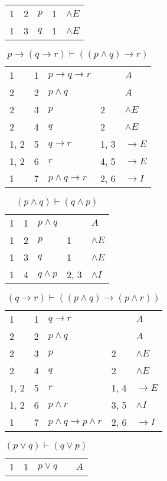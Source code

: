 \documentclass{article}
\begin{document}
\begin{table}[htbp]
\begin{tabular}{lrlll}
{1} & 2 & $p$ & {1} & $∧E$ \\
{1} & 3 & $q$ & {1} & $∧E$ \\
\end{tabular}
\end{table}\begin{table}[htbp]\caption*{$p → (q → r) ⊢ ((p ∧ q) → r)$}\centering\begin{tabular}{lrlll}
{1} & 1 & $p→q→r$ & {} & $A$ \\
{2} & 2 & $p∧q$ & {} & $A$ \\
{2} & 3 & $p$ & {2} & $∧E$ \\
{2} & 4 & $q$ & {2} & $∧E$ \\
{1, 2} & 5 & $q→r$ & {1, 3} & $→E$ \\
{1, 2} & 6 & $r$ & {4, 5} & $→E$ \\
{1} & 7 & $p∧q→r$ & {2, 6} & $→I$ \\
\end{tabular}
\end{table}\begin{table}[htbp]\caption*{$(p ∧ q) ⊢ (q ∧ p)$}\centering\begin{tabular}{lrlll}
{1} & 1 & $p∧q$ & {} & $A$ \\
{1} & 2 & $p$ & {1} & $∧E$ \\
{1} & 3 & $q$ & {1} & $∧E$ \\
{1} & 4 & $q∧p$ & {2, 3} & $∧I$ \\
\end{tabular}
\end{table}\begin{table}[htbp]\caption*{$(q → r) ⊢ ((p ∧ q) → (p ∧ r))$}\centering\begin{tabular}{lrlll}
{1} & 1 & $q→r$ & {} & $A$ \\
{2} & 2 & $p∧q$ & {} & $A$ \\
{2} & 3 & $p$ & {2} & $∧E$ \\
{2} & 4 & $q$ & {2} & $∧E$ \\
{1, 2} & 5 & $r$ & {1, 4} & $→E$ \\
{1, 2} & 6 & $p∧r$ & {3, 5} & $∧I$ \\
{1} & 7 & $p∧q→p∧r$ & {2, 6} & $→I$ \\
\end{tabular}
\end{table}\begin{table}[htbp]\caption*{$(p∨q) ⊢ (q∨p)$}\centering\begin{tabular}{lrlll}
{1} & 1 & $p∨q$ & {} & $A$ \\

\end{tabular}
\end{table}
\end{document}
